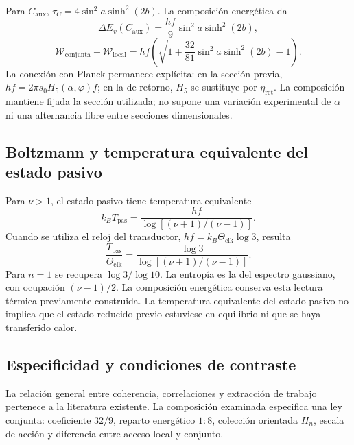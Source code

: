 Para $C_{\mathrm{aux}}$,
$\tau_C=4\sin^2a\sinh^2(2b)$. La composición energética da
\begin{equation}
 \boxed{\Delta E_v(C_{\mathrm{aux}})
 =\frac{hf}{9}\sin^2a\sinh^2(2b),}
 \label{md:aux:energia-compensado}
\end{equation}
\begin{equation}
 \mathcal W_{\mathrm{conjunta}}-\mathcal W_{\mathrm{local}}
 =hf\left(\sqrt{1+\frac{32}{81}\sin^2a\sinh^2(2b)}-1\right).
 \label{md:aux:trabajo-compensado}
\end{equation}
La conexión con Planck permanece explícita: en la sección
previa, $hf=2\pi s_0H_5(\alpha,\varphi)f$; en la de retorno,
$H_5$ se sustituye por $\eta_{\mathrm{ret}}$. La composición
mantiene fijada la sección utilizada; no supone una
variación experimental de $\alpha$ ni una alternancia libre
entre secciones dimensionales.

\subsection{Boltzmann y temperatura equivalente del estado pasivo}
\label{md:aux:temperatura}

Para $\nu>1$, el estado pasivo tiene temperatura equivalente
\begin{equation}
 k_BT_{\mathrm{pas}}
 =\frac{hf}{\log[(\nu+1)/(\nu-1)]}.
 \label{md:aux:temperatura-pasiva}
\end{equation}
Cuando se utiliza el reloj del transductor,
$hf=k_B\Theta_{\mathrm{clk}}\log3$, resulta
\begin{equation}
 \frac{T_{\mathrm{pas}}}{\Theta_{\mathrm{clk}}}
 =\frac{\log3}{\log[(\nu+1)/(\nu-1)]}.
 \label{md:aux:razon-temperaturas}
\end{equation}
Para $n=1$ se recupera $\log3/\log10$. La entropía es
la del espectro gaussiano, con ocupación $(\nu-1)/2$.
La composición energética conserva esta lectura térmica
previamente construida. La temperatura equivalente del
estado pasivo no implica que el estado reducido previo
estuviese en equilibrio ni que se haya transferido calor.

\subsection{Especificidad y condiciones de contraste}
\label{md:aux:contraste-trabajo}

La relación general entre coherencia, correlaciones y
extracción de trabajo pertenece a la literatura existente.
La composición examinada especifica una ley conjunta:
coeficiente $32/9$, reparto energético $1:8$, colección
orientada $H_n$, escala de acción y diferencia entre
acceso local y conjunto.

